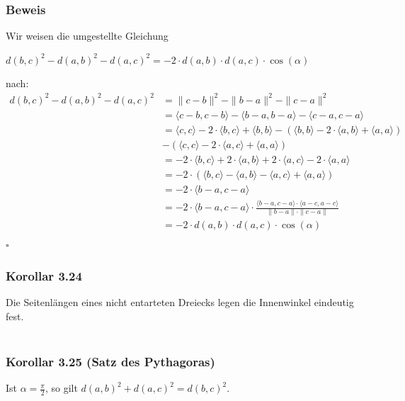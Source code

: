 \documentclass{article}
\begin{document}
\subsubsection*{Beweis}
Wir weisen die umgestellte Gleichung \\
\begin{center}
    $d(b,c)^2 - d(a,b)^2 - d(a,c)^2 = -2 \cdot d(a,b) \cdot d(a,c) \cdot \cos(\alpha)$ \\
\end{center}
nach: \\
\begin{align*}
    d(b,c)^2 - d(a,b)^2 - d(a,c)^2 &= \|c-b\|^2 - \|b-a\|^2 - \|c-a\|^2 \\
    &= \langle c-b,c-b \rangle - \langle b-a,b-a \rangle - \langle c-a,c-a \rangle \\
    &= \langle c,c \rangle - 2 \cdot \langle b,c \rangle + \langle b,b \rangle - (\langle b,b \rangle - 2 \cdot \langle a,b \rangle + \langle a,a \rangle) \\
    &- (\langle c,c \rangle - 2 \cdot \langle a,c \rangle + \langle a,a \rangle) \\
    &= -2 \cdot \langle b,c \rangle + 2 \cdot \langle a,b \rangle + 2 \cdot \langle a,c \rangle - 2 \cdot \langle a,a \rangle \\
    &= -2 \cdot (\langle b,c \rangle - \langle a,b \rangle - \langle a,c \rangle + \langle a,a \rangle) \\
    &= -2 \cdot \langle b-a,c-a \rangle \\
    &= -2 \cdot \langle b-a,c-a \rangle \cdot \frac{\langle b-a,c-a \rangle \cdot \langle a-c, a-c \rangle}{\|b-a\| \cdot \|c-a\|} \\
    &= -2 \cdot d(a,b) \cdot d(a,c) \cdot \cos(\alpha) \\
\end{align*}
$\square$ \\

\subsubsection*{Korollar 3.24}
Die Seitenlängen eines nicht entarteten Dreiecks legen die Innenwinkel eindeutig fest. \\
\\
\subsubsection*{Korollar 3.25 (Satz des Pythagoras)}
Ist $\alpha = \frac{\pi}{2}$, so gilt $d(a,b)^2 + d(a,c)^2 = d(b,c)^2$. \\
\\
\end{document}
